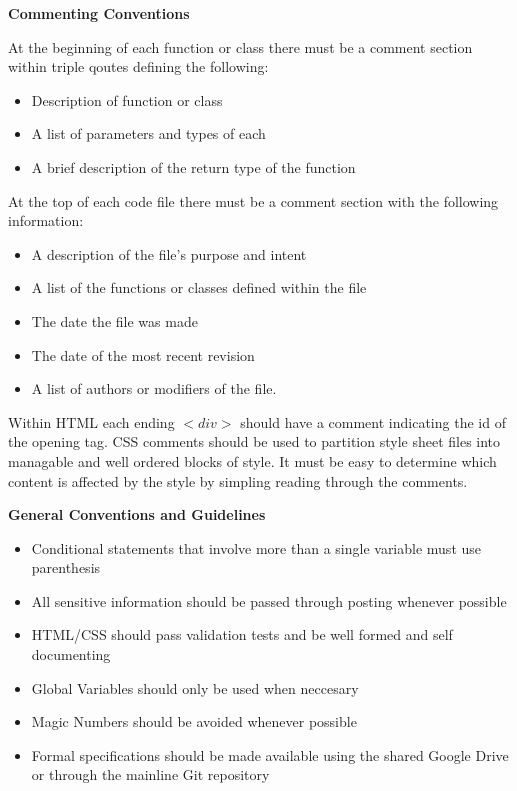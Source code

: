 \documentclass[12pt]{IEEEtran}
\begin{document}
	\bfseries Commenting Conventions \mdseries

	At the beginning of each function or class there must be a comment section within triple qoutes defining the following:
	\begin{itemize}
		\item Description of function or class
		\item A list of parameters and types of each
		\item A brief description of the return type of the function
	\end{itemize}

	At the top of each code file there must be a comment section with the following information:
	\begin{itemize}
		\item A description of the file's purpose and intent
		\item A list of the functions or classes defined within the file
		\item The date the file was made
		\item The date of the most recent revision
		\item A list of authors or modifiers of the file. 
	\end{itemize}

	Within HTML each ending $<div>$ should have a comment indicating the id of the opening tag. CSS comments should be 	used to partition style sheet files into managable and well ordered blocks of style. It must be easy to determine which 			content is affected by the style by simpling reading through the comments.

	\bfseries General Conventions and Guidelines  \mdseries

	\begin{itemize}
		\item Conditional statements that involve more than a single variable must use parenthesis
		\item All sensitive information should be passed through posting whenever possible
		\item HTML/CSS should pass validation tests and be well formed and self documenting
		\item Global Variables should only be used when neccesary
		\item Magic Numbers should be avoided whenever possible 
		\item Formal specifications should be made available using the shared Google Drive or through the mainline Git repository
	\end{itemize}
\end{document}
